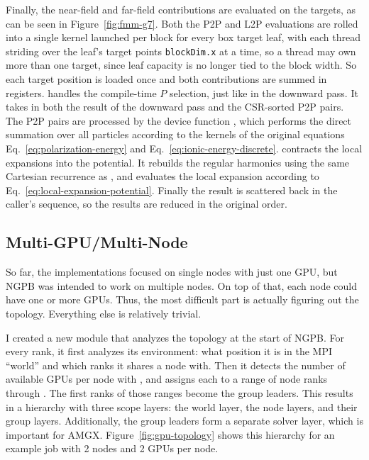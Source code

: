Finally, the near-field and far-field contributions are evaluated on the targets, as can be seen in Figure~\ref{fig:fmm-g7}.
Both the P2P and L2P evaluations are rolled into a single kernel  launched per block for every box target leaf, with each thread striding over the leaf's target points \texttt{blockDim.x} at a time, so a thread may own more than one target, since leaf capacity is no longer tied to the block width.
So each target position is loaded once and both contributions are summed in registers.
 handles the compile-time $P$ selection, just like in the downward pass.
It takes in both the result of the downward pass and the CSR-sorted P2P pairs.
The P2P pairs are processed by the device function , which performs the direct summation over all particles according to the kernels of the original equations Eq.~\eqref{eq:polarization-energy} and Eq.~\eqref{eq:ionic-energy-discrete}.
 contracts the local expansions into the potential.
It rebuilds the regular harmonics using the same Cartesian recurrence as , and evaluates the local expansion according to Eq.~\eqref{eq:local-expansion-potential}.
Finally the result is scattered back in the caller's sequence, so the results are reduced in the original order.


\FloatBarrier

\subsection{Multi-GPU/Multi-Node}
\label{sec:implementation-multi-gpu}

So far, the implementations focused on single nodes with just one GPU, but NGPB was intended to work on multiple nodes.
On top of that, each node could have one or more GPUs.
Thus, the most difficult part is actually figuring out the topology.
Everything else is relatively trivial.

I created a new  module that analyzes the topology at the start of NGPB.
For every rank, it first analyzes its environment: what position it is in the MPI ``world'' and which ranks it shares a node with.
Then it detects the number of available GPUs per node with , and assigns each to a range of node ranks through .
The first ranks of those ranges become the group leaders.
This results in a hierarchy with three scope layers: the world layer, the node layers, and their group layers.
Additionally, the group leaders form a separate solver layer, which is important for AMGX.
Figure~\ref{fig:gpu-topology} shows this hierarchy for an example job with 2 nodes and 2 GPUs per node.

